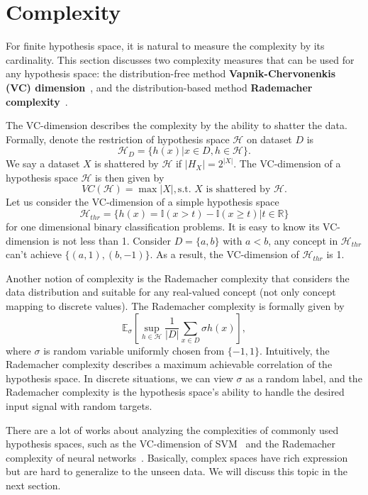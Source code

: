 \documentclass[a4paper,11pt]{article}
\begin{document}
\section{Complexity}
\label{sec:Complexity}

For finite hypothesis space, it is natural to measure the complexity by its cardinality. This section discusses two complexity measures that can be used for any hypothesis space: the distribution-free method \textbf{Vapnik-Chervonenkis (VC) dimension}~\citep{vapnik1971uniform}, and the distribution-based method \textbf{Rademacher complexity}~\citep{bartlett2002rademacher}.

The VC-dimension describes the complexity by the ability to shatter the data. Formally, denote the restriction of hypothesis space $\mathcal{H}$ on dataset $D$ is $$\mathcal{H}_D = \{h(x)|x \in D, h \in \mathcal{H}\}.$$ We say a dataset $X$ is shattered by $\mathcal{H}$ if $|H_X| = 2^{|X|}$. The VC-dimension of a hypothesis space $\mathcal{H}$ is then given by $$VC(\mathcal{H}) = \max |X|, \text{s.t. $X$ is shattered by $\mathcal{H}$}.$$ Let us consider the VC-dimension of a simple hypothesis space $$\mathcal{H}_{thr} = \{h(x) = \mathbb{I}(x > t) - \mathbb{I}(x \ge t) | t \in \mathbb{R}\}$$ for one dimensional binary classification problems. It is easy to know its VC-dimension is not less than 1. Consider $D=\{a, b\}$ with $a < b$, any concept in $\mathcal{H}_{thr}$ can't achieve $\{(a, 1), (b, -1)\}$. As a result, the VC-dimension of $\mathcal{H}_{thr}$ is 1.

Another notion of complexity is the Rademacher complexity that considers the data distribution and suitable for any real-valued concept (not only concept mapping to discrete values). The Rademacher complexity is formally given by $$\mathbb{E}_\sigma[\sup_{h\in\mathcal{H}}\frac{1}{|D|} \sum_{x \in D} \sigma h(x)],$$ where $\sigma$ is random variable uniformly chosen from $\{-1, 1\}$. Intuitively, the Rademacher complexity describes a maximum achievable correlation of the hypothesis space. In discrete situations, we can view $\sigma$ as a random label, and the Rademacher complexity is the hypothesis space's ability to handle the desired input signal with random targets.

There are a lot of works about analyzing the complexities of commonly used hypothesis spaces, such as the VC-dimension of SVM~\citep{burges1998tutorial} and the Rademacher complexity of neural networks~\citep{bartlett2017spectrally}. Basically, complex spaces have rich expression but are hard to generalize to the unseen data. We will discuss this topic in the next section.
\end{document}
